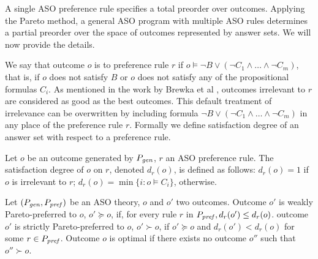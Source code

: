
A single ASO preference rule specifies a total preorder over outcomes.
Applying the Pareto method, a general ASO program with multiple ASO rules
determines a partial preorder over the space of outcomes represented by answer sets.
We will now provide the details.

We say that outcome $o$ is  to preference rule $r$ if
$o \models \neg B \vee (\neg C_1 \wedge \ldots \wedge \neg C_m)$,
that is, if $o$ does not satisfy $B$ or $o$ does not satisfy any of
the propositional formulas $C_i$. As mentioned in the work by Brewka et al \cite{Brewka03answerset},
outcomes irrelevant to $r$ are considered as good as the
best outcomes.
This default treatment of irrelevance can be overwritten by
including formula $\neg B \vee (\neg C_1 \wedge \ldots \wedge \neg C_m)$
in any place of the preference rule $r$.
Formally we define satisfaction degree of an answer set with respect to a
preference rule.
\begin{definition}
	Let $o$ be an outcome generated by $P_{\mathit{gen}}$,
	$r$ an ASO preference rule.
	The satisfaction degree of $o$ on $r$, denoted $d_r(o)$,
	is defined as follows: $d_r(o)=1$ if $o$ is irrelevant to $r$;
	$d_r(o)=\min\{i:o \models C_i\}$, otherwise.
\end{definition}

\begin{definition}
	Let $(P_{\mathit{gen}}, P_{\mathit{pref}})$ be an ASO theory,
	$o$ and $o'$ two outcomes.
	Outcome $o'$ is weakly Pareto-preferred to $o$, $o' \succeq o$,
	if, for every rule $r$ in $P_{\mathit{pref}}, d_r(o') \leq d_r(o)$.
	outcome $o'$ is strictly Pareto-preferred to $o$, $o' \succ o$,
	if $o' \succeq o$ and $d_r(o') < d_r(o)$ for some $r \in P_{\mathit{pref}}$.
	Outcome $o$ is optimal if there exists no outcome $o''$ such that
	$o'' \succ o$.
\end{definition}

